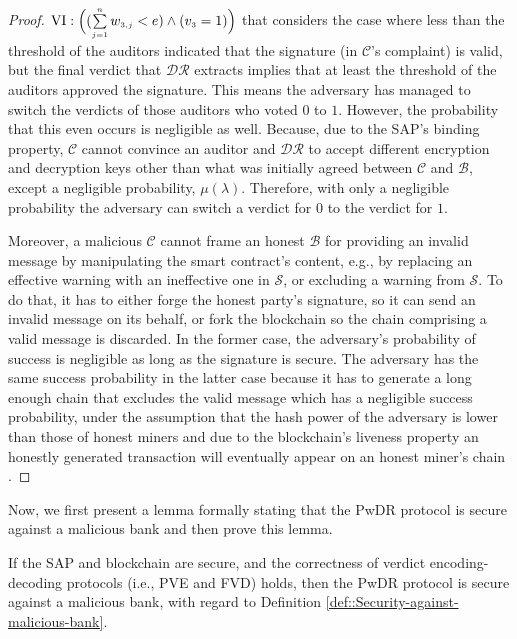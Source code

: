 \begin{proof}
 $\text{\MakeUppercase{\romannumeral 6}}: \Big((\sum\limits_{\st j=1}^{\st n}w_{\st 3,j}< {e}) \wedge ( {v}_{\st 3}=1)\Big)$ that considers the case where less than the threshold of the auditors indicated that the signature (in $\mathcal{C}$'s complaint) is valid, but   the final verdict that $\mathcal{DR}$ extracts implies that at least the threshold of the auditors approved the signature. This means the adversary has managed to switch the verdicts of those auditors who voted $0$ to $1$. However, the probability that this even occurs is negligible as well. Because, due to the SAP's binding property,  $\mathcal{C}$ cannot convince an auditor and $\mathcal{DR}$ to accept different encryption and decryption keys other than what was initially agreed between $\mathcal{C}$ and $\mathcal{B}$, except a negligible probability, $\mu(\lambda)$.  Therefore, with only a negligible probability the adversary can switch a verdict for $0$ to the verdict for $1$. 
 
 
 Moreover, a malicious $\mathcal{C}$ cannot frame an honest $\mathcal{B}$ for providing an invalid message by manipulating the smart contract’s content,  e.g., by replacing an effective warning with an ineffective one in $\mathcal{S}$, or excluding a warning from $\mathcal{S}$. To do that, it has to either forge the honest party’s signature, so it can send an invalid message on its behalf, or fork the blockchain so the chain comprising a valid message is discarded. In the former case, the adversary’s probability of success is negligible as long as the signature is secure. The adversary has the same success probability in the latter case because it has to generate a long enough chain that excludes the valid message which has a negligible success probability, under the assumption that the hash power of the adversary is lower than those of honest miners and due to the blockchain’s liveness property an honestly generated transaction will eventually appear on an honest miner’s chain \cite{GarayKL15}. 
\end{proof}


Now, we first present a lemma formally stating that the PwDR protocol is secure against a malicious bank and then prove this lemma. 

\begin{lemma}\label{lemma::secure-against-a-malicious-bank} If the  SAP and blockchain are secure, and the correctness of verdict encoding-decoding protocols (i.e., PVE and FVD) holds, then the PwDR protocol is secure against a malicious bank, with regard to Definition \ref{def::Security-against-malicious-bank}. 
\end{lemma}



